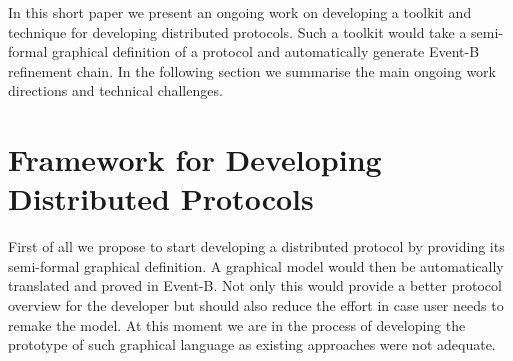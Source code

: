 \documentclass{llncs}
\begin{document}
		
		
		In this short paper we present an ongoing work on developing a toolkit and technique for developing distributed protocols. Such a toolkit would take a semi-formal graphical definition of a protocol and automatically generate Event-B refinement chain. In the following section we summarise the main ongoing work directions and technical challenges.
		
		
		
		
		
		
		
		
		
		
		
		
		
		
		
		\section*{Framework for Developing Distributed Protocols}
		First of all we propose to start developing a distributed protocol by providing its semi-formal graphical definition. A graphical model would then be automatically translated and proved in Event-B. Not only this would provide a better protocol overview for the developer but should also reduce the effort in case user needs to remake the model. At this moment we are in the process of developing the prototype of such graphical language as existing approaches were not adequate. 
		
\end{document}
